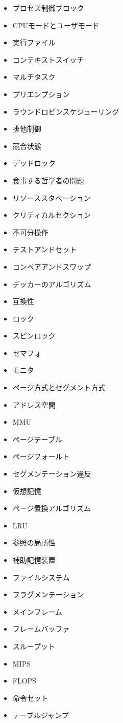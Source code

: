 \documentclass[a4j, titlepage, 11pt]{jsarticle}
\begin{document}
\begin{multicols}{2}
\begin{itemize}
	\item プロセス制御ブロック
	\item CPUモードとユーザモード
	\item 実行ファイル
	\item コンテキストスイッチ
	\item マルチタスク
	\item プリエンプション
	\item ラウンドロビンスケジューリング
	\item 排他制御
	\item 競合状態
	\item デッドロック
	\item 食事する哲学者の問題
	\item リソーススタベーション
	\item クリティカルセクション
	\item 不可分操作
	\item テストアンドセット
	\item コンペアアンドスワップ
	\item デッカーのアルゴリズム
	\item 互換性
	\item ロック
	\item スピンロック
	\item セマフォ
	\item モニタ
	\item ページ方式とセグメント方式
	\item アドレス空間
	\item MMU
	\item ページテーブル
	\item ページフォールト
	\item セグメンテーション違反
	\item 仮想記憶
	\item ページ置換アルゴリズム
	\item LRU
	\item 参照の局所性
	\item 補助記憶装置
	\item ファイルシステム
	\item フラグメンテーション
	\item メインフレーム
	\item フレームバッファ
	\item スループット
	\item MIPS
	\item FLOPS
	\item 命令セット
	\item テーブルジャンプ

\end{itemize}
\end{multicols}
\end{document}
